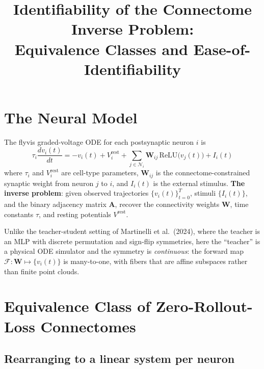 \documentclass[11pt,a4paper]{article}
\title{Identifiability of the Connectome Inverse Problem:\\
Equivalence Classes and Ease-of-Identifiability}
\date{}
\begin{document}
\maketitle

\section{The Neural Model}

The flyvis graded-voltage ODE for each postsynaptic neuron $i$ is
\begin{equation}
\tau_i\frac{dv_i(t)}{dt} = -v_i(t) + V_i^{\text{rest}}
+ \sum_{j\in\mathcal{N}_i} \mathbf{W}_{ij}\,
  \text{ReLU}\!\big(v_j(t)\big)
+ I_i(t)
\label{Eq:ODE}
\end{equation}
where $\tau_i$ and $V_i^{\mathrm{rest}}$ are cell-type parameters, $\mathbf{W}_{ij}$ is the
connectome-constrained synaptic weight from neuron $j$ to $i$, and $I_i(t)$ is the
external stimulus. \textbf{The inverse problem}: given observed trajectories
$\{v_i(t)\}_{t=0}^{T}$, stimuli $\{I_i(t)\}$, and the binary adjacency matrix
$\mathbf{A}$, recover the connectivity weights $\mathbf{W}$, time constants $\tau$,
and resting potentials $V^{\text{rest}}$.

Unlike the teacher-student setting of Martinelli et al.\ (2024), where the teacher
is an MLP with discrete permutation and sign-flip symmetries, here the ``teacher''
is a physical ODE simulator and the symmetry is \emph{continuous}: the forward map
$\mathcal{F}: \mathbf{W} \mapsto \{v_i(t)\}$ is many-to-one, with fibers that are
affine subspaces rather than finite point clouds.

\section{Equivalence Class of Zero-Rollout-Loss Connectomes}

\subsection{Rearranging to a linear system per neuron}
\end{document}
